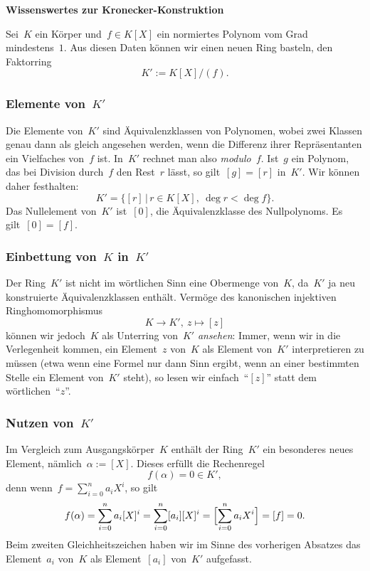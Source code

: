 \documentclass{../../alg2/algblatt}
\begin{document}
\begin{center}\Large \sffamily\textbf{Wissenswertes zur Kronecker-Konstruktion}\end{center}

Sei~$K$ ein Körper und~$f \in K[X]$ ein normiertes Polynom vom Grad
mindestens~$1$. Aus diesen Daten können wir einen neuen Ring basteln, den Faktorring
\[ K' := K[X]/(f). \]


\subsubsection*{Elemente von~$K'$}

Die Elemente von~$K'$ sind Äquivalenzklassen von Polynomen, wobei zwei Klassen
genau dann als gleich angesehen werden, wenn die Differenz ihrer Repräsentanten
ein Vielfaches von~$f$ ist. In~$K'$ rechnet man also \emph{modulo~$f$}. Ist~$g$
ein Polynom, das bei Division durch~$f$ den Rest~$r$ lässt, so gilt~$[g] = [r]$
in~$K'$. Wir können daher festhalten:
\[ K' = \{ [r] \,|\, r \in K[X],\ \deg r < \deg f \}. \]
Das Nullelement von~$K'$ ist~$[0]$, die Äquivalenzklasse des Nullpolynoms. Es
gilt~$[0] = [f]$.


\subsubsection*{Einbettung von~$K$ in~$K'$}

Der Ring~$K'$ ist nicht im wörtlichen Sinn eine Obermenge von~$K$, da~$K'$ ja
neu kon\-stru\-ier\-te Äquivalenzklassen enthält. Vermöge des kanonischen injektiven
Ringhomomorphismus
\[ K \longrightarrow K',\ z \longmapsto [z] \]
können wir jedoch~$K$ als Unterring von~$K'$ \emph{ansehen}: Immer, wenn wir in
die Verlegenheit kommen, ein Element~$z$ von~$K$ als Element von~$K'$
interpretieren zu müssen (etwa wenn eine Formel nur dann Sinn ergibt, wenn an
einer bestimmten Stelle ein Element von~$K'$ steht), so lesen wir
einfach~"`$[z]$"' statt dem wörtlichen~"`$z$"'.


\subsubsection*{Nutzen von~$K'$}

Im Vergleich zum Ausgangskörper~$K$ enthält der Ring~$K'$ ein besonderes neues
Element, nämlich~$\alpha := [X]$. Dieses erfüllt die Rechenregel
\[ f(\alpha) = 0 \in K', \]
denn wenn~$f = \sum_{i=0}^n a_i X^i$, so gilt
\[ f(\alpha) = \sum_{i=0}^n a_i [X]^i = \sum_{i=0}^n [a_i] [X]^i =
  \Bigl[\sum_{i=0}^n a_i X^i\Bigr] = [f] = 0. \]
Beim zweiten Gleichheitszeichen haben wir im Sinne des vorherigen Absatzes das
Element~$a_i$ von~$K$ als Element~$[a_i]$ von~$K'$ aufgefasst.
\end{document}

